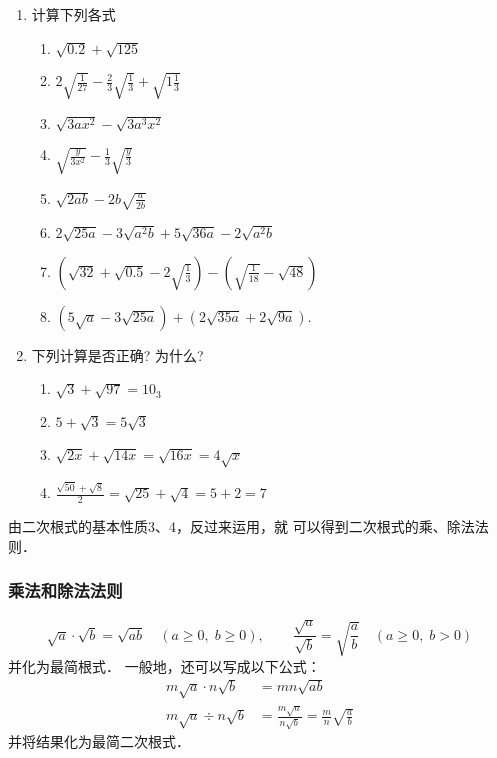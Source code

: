 \begin{ex}
\begin{enumerate}
    \item 计算下列各式
\begin{enumerate}
    \item $\sqrt{0.2}+\sqrt{125}$
    \item $2\sqrt{\frac{1}{27}}-\frac{2}{3}\sqrt{\frac{1}{3}}+\sqrt{1\frac{1}{3}}$
    \item $\sqrt{3 a x^{2}}-\sqrt{3 a^{3} x^{2}}$
    \item $\sqrt{\frac{y}{3 x^{2}}}-\frac{1}{3} \sqrt{\frac{y}{3}}$
    \item $\sqrt{2 a b}-2 b \sqrt{\frac{a}{2 b}}$
    \item $2 \sqrt{25 a}-3 \sqrt{a^{2}b}+5 \sqrt{36 a}-2 \sqrt{a^{2} b}$
    \item  $\left(\sqrt{32}+\sqrt{0.5}-2 \sqrt{\frac{1}{3}}\right)-\left(\sqrt{\frac{1}{18}}-\sqrt{48}\right)$
    \item  $(5 \sqrt{a}-3 \sqrt{25 a})+(2 \sqrt{35 a}+2 \sqrt{9 a})$.
\end{enumerate}

\item 下列计算是否正确? 为什么?
\begin{enumerate}
    \item  $\sqrt{3}+\sqrt{97}=10_{3}$
    \item $5+\sqrt{3}=5 \sqrt{3}$
    \item $\sqrt{2 x}+\sqrt{14 x}=\sqrt{16 x}=4 \sqrt{x}$
    \item $\frac{\sqrt{50}+\sqrt{8}}{2}=\sqrt{25}+\sqrt{4}=5+2=7$
\end{enumerate}
\end{enumerate}
\end{ex}

由二次根式的基本性质3、4，反过来运用，就
可以得到二次根式的乘、除法法则．

\subsubsection{乘法和除法法则}
\[\sqrt{a}\cdot \sqrt{b}=\sqrt{ab}\quad (a\ge 0,\; b\ge 0),\qquad \frac{\sqrt{a}}{\sqrt{b}}=\sqrt{\frac{a}{b}}\quad (a\ge 0,\; b>0)  \]
并化为最简根式．
一般地，还可以写成以下公式：
\[\begin{split}
    m\sqrt{a}\cdot n\sqrt{b}&= mn\sqrt{ab}\\
    m\sqrt{a}\div n\sqrt{b}&=\frac{m\sqrt{a}}{n\sqrt{b}}=\frac{m}{n}\sqrt{\frac{a}{b}}
\end{split}\]
并将结果化为最简二次根式．

